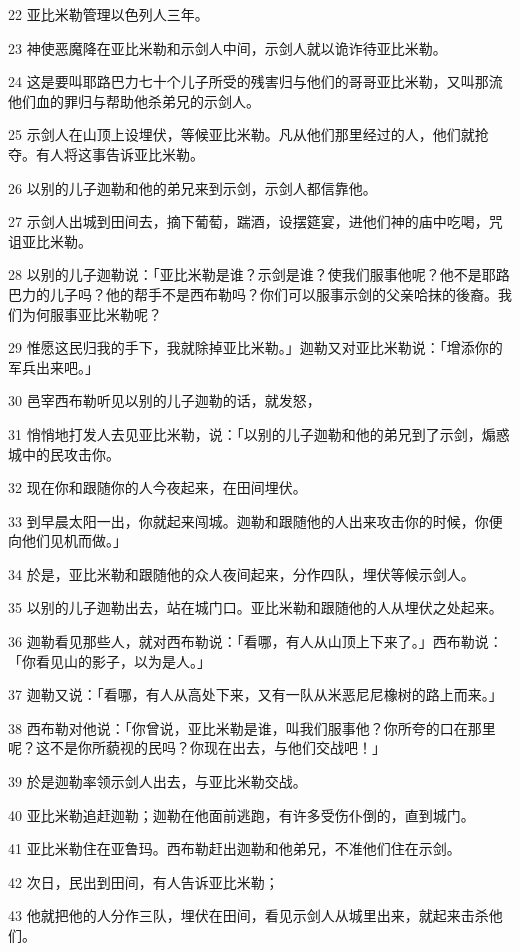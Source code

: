 \par 22 亚比米勒管理以色列人三年。
\par 23 神使恶魔降在亚比米勒和示剑人中间，示剑人就以诡诈待亚比米勒。
\par 24 这是要叫耶路巴力七十个儿子所受的残害归与他们的哥哥亚比米勒，又叫那流他们血的罪归与帮助他杀弟兄的示剑人。
\par 25 示剑人在山顶上设埋伏，等候亚比米勒。凡从他们那里经过的人，他们就抢夺。有人将这事告诉亚比米勒。
\par 26 以别的儿子迦勒和他的弟兄来到示剑，示剑人都信靠他。
\par 27 示剑人出城到田间去，摘下葡萄，踹酒，设摆筵宴，进他们神的庙中吃喝，咒诅亚比米勒。
\par 28 以别的儿子迦勒说：「亚比米勒是谁？示剑是谁？使我们服事他呢？他不是耶路巴力的儿子吗？他的帮手不是西布勒吗？你们可以服事示剑的父亲哈抹的後裔。我们为何服事亚比米勒呢？
\par 29 惟愿这民归我的手下，我就除掉亚比米勒。」迦勒又对亚比米勒说：「增添你的军兵出来吧。」
\par 30 邑宰西布勒听见以别的儿子迦勒的话，就发怒，
\par 31 悄悄地打发人去见亚比米勒，说：「以别的儿子迦勒和他的弟兄到了示剑，煽惑城中的民攻击你。
\par 32 现在你和跟随你的人今夜起来，在田间埋伏。
\par 33 到早晨太阳一出，你就起来闯城。迦勒和跟随他的人出来攻击你的时候，你便向他们见机而做。」
\par 34 於是，亚比米勒和跟随他的众人夜间起来，分作四队，埋伏等候示剑人。
\par 35 以别的儿子迦勒出去，站在城门口。亚比米勒和跟随他的人从埋伏之处起来。
\par 36 迦勒看见那些人，就对西布勒说：「看哪，有人从山顶上下来了。」西布勒说：「你看见山的影子，以为是人。」
\par 37 迦勒又说：「看哪，有人从高处下来，又有一队从米恶尼尼橡树的路上而来。」
\par 38 西布勒对他说：「你曾说，亚比米勒是谁，叫我们服事他？你所夸的口在那里呢？这不是你所藐视的民吗？你现在出去，与他们交战吧！」
\par 39 於是迦勒率领示剑人出去，与亚比米勒交战。
\par 40 亚比米勒追赶迦勒；迦勒在他面前逃跑，有许多受伤仆倒的，直到城门。
\par 41 亚比米勒住在亚鲁玛。西布勒赶出迦勒和他弟兄，不准他们住在示剑。
\par 42 次日，民出到田间，有人告诉亚比米勒；
\par 43 他就把他的人分作三队，埋伏在田间，看见示剑人从城里出来，就起来击杀他们。
